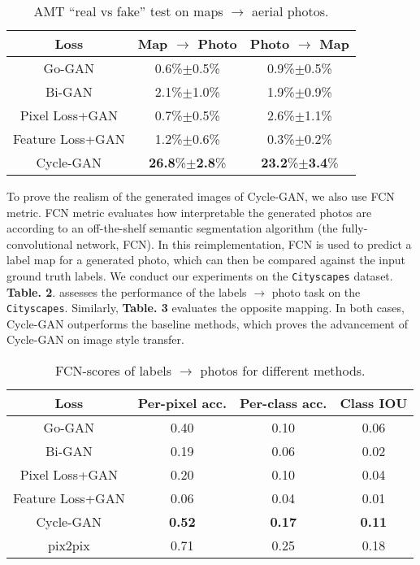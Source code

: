 \documentclass[a4paper]{article}
\renewcommand{\baselinestretch}{1.2}
\begin{document}
\vspace{2mm}
\renewcommand{\baselinestretch}{1.3}
\begin{table}
\begin{center}
\begin{tabular}{ccc} 
\hline
\textbf{Loss}& \textbf{Map $\to$ Photo} & \textbf{Photo $\to$ Map}\\
\hline
\textsf{Go-GAN}&0.6\%$\pm$0.5\%&0.9\%$\pm$0.5\%\\
\textsf{Bi-GAN}&2.1\%$\pm$1.0\%&1.9\%$\pm$0.9\%\\
\textsf{Pixel Loss}+\textsf{GAN}&0.7\%$\pm$0.5\% &2.6\%$\pm$1.1\%\\
\textsf{Feature Loss}+\textsf{GAN}&1.2\%$\pm$0.6\%&0.3\%$\pm$0.2\%\\
\textsf{Cycle-GAN}& \textbf{26.8}\%$\pm$\textbf{2.8}\%&\textbf{23.2}\%$\pm$\textbf{3.4}\%\\
\hline
\end{tabular}
\end{center}
\caption{AMT “real vs fake” test on maps $\to$ aerial photos.}
\end{table}
\renewcommand{\baselinestretch}{1.0}
To prove the realism of the generated images of \textsf{Cycle-GAN}, we also use FCN metric. FCN metric evaluates how interpretable the generated photos are according to an off-the-shelf semantic segmentation algorithm (the fully-convolutional network, FCN). In this reimplementation, FCN is used to predict a label map for a generated photo, which can then be compared against the input ground truth labels. We conduct our experiments on the \texttt{Cityscapes} dataset. \textbf{Table. 2}. assesses the performance of the labels $\to$ photo task on the \texttt{Cityscapes}. Similarly, \textbf{Table. 3} evaluates the opposite mapping. In both cases, \textsf{Cycle-GAN} outperforms the baseline methods, which proves the advancement of \textsf{Cycle-GAN} on image style transfer.
\renewcommand{\baselinestretch}{1.5}
\begin{table} 
\begin{center}
\begin{tabular}{cccc} 
\hline
\textbf{Loss}& \textbf{Per-pixel acc.} & \textbf{Per-class acc.}&\textbf{Class IOU}\\
\hline
\textsf{Go-GAN}&0.40&0.10&0.06\\
\textsf{Bi-GAN}&0.19&0.06&0.02\\
\textsf{Pixel Loss}+\textsf{GAN}&0.20&0.10&0.04\\
\textsf{Feature Loss}+\textsf{GAN}&0.06&0.04&0.01\\
\textsf{Cycle-GAN}&\textbf{0.52}&\textbf{0.17}&\textbf{0.11}\\
\hline
\textsf{pix2pix}&0.71&0.25&0.18\\
\end{tabular}
\end{center}
\caption{FCN-scores of labels $\to$ photos for different methods.}
\end{table}
\end{document}

